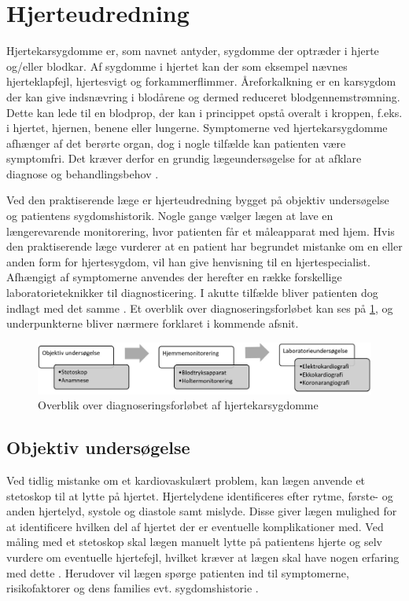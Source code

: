 \section{Hjerteudredning}
Hjertekarsygdomme er, som navnet antyder, sygdomme der optræder i hjerte og/eller blodkar. Af sygdomme i hjertet kan der som eksempel nævnes hjerteklapfejl, hjertesvigt og forkammerflimmer. Åreforkalkning er en karsygdom der kan give indsnævring i blodårene og dermed reduceret blodgennemstrømning. Dette kan lede til en blodprop, der kan i princippet opstå overalt i kroppen, f.eks. i hjertet, hjernen, benene eller lungerne. Symptomerne ved hjertekarsygdomme afhænger af det berørte organ, dog i nogle tilfælde kan patienten være symptomfri. Det kræver derfor en grundig lægeundersøgelse for at afklare diagnose og behandlingsbehov \cite{apoteket}. 

Ved den praktiserende læge er hjerteudredning bygget på objektiv undersøgelse og patientens sygdomshistorik. Nogle gange vælger lægen at lave en længerevarende monitorering, hvor patienten får et måleapparat med hjem. Hvis den praktiserende læge vurderer at en patient har begrundet mistanke om en eller anden form for hjertesygdom, vil han give henvisning til en hjertespecialist. Afhængigt af symptomerne anvendes der herefter en række forskellige laboratorieteknikker til diagnosticering. I akutte tilfælde bliver patienten dog indlagt med det samme \cite{hjerud}. Et overblik over diagnoseringsforløbet kan ses på \ref{fig:forloeb}, og underpunkterne bliver nærmere forklaret i kommende afsnit.

\begin{figure}[H] %
\begin{center}
\includegraphics[width=1\textwidth]{figures/forloeb}
\end{center}
\caption{Overblik over diagnoseringsforløbet af hjertekarsygdomme}
\label{fig:forloeb}
\end{figure}

\subsection{Objektiv undersøgelse}
Ved tidlig mistanke om et kardiovaskulært problem, kan lægen anvende et stetoskop til at lytte på hjertet. Hjertelydene identificeres efter rytme, første- og anden hjertelyd, systole og diastole samt mislyde. Disse giver lægen mulighed for at identificere hvilken del af hjertet der er eventuelle komplikationer med. Ved måling med et stetoskop skal lægen manuelt lytte på patientens hjerte og selv vurdere om eventuelle hjertefejl, hvilket kræver at lægen skal have nogen erfaring med dette \cite{subob}. Herudover vil lægen spørge patienten ind til symptomerne, risikofaktorer og dens families evt. sygdomshistorie \cite{hjerud}. 
 
